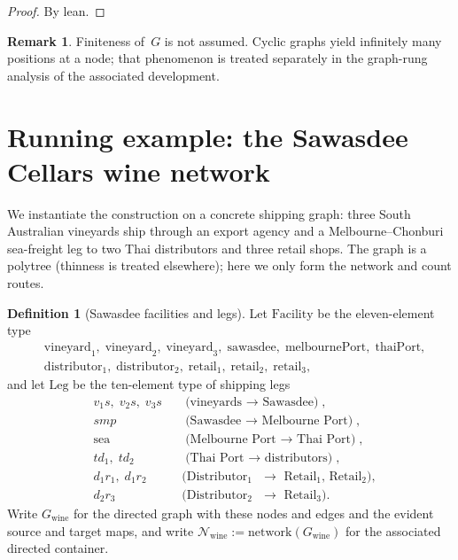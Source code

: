 \documentclass[11pt,a4paper]{article}
\theoremstyle{plain}
\theoremstyle{definition}
\newtheorem{definition}[theorem]{Definition}
\newtheorem{remark}[theorem]{Remark}
\begin{document}
\begin{proof}
By lean.
\end{proof}

\begin{remark}
Finiteness of~$G$ is not assumed. Cyclic graphs yield infinitely many
positions at a node; that phenomenon is treated separately in the graph-rung
analysis of the associated development.
\end{remark}

\section{Running example: the Sawasdee Cellars wine network}

We instantiate the construction on a concrete shipping graph: three South
Australian vineyards ship through an export agency and a Melbourne--Chonburi
sea-freight leg to two Thai distributors and three retail shops. The graph is
a polytree (thinness is treated elsewhere); here we only form the network and
count routes.

\begin{definition}[Sawasdee facilities and legs]\label{def:wine}
Let $\mathrm{Facility}$ be the eleven-element type
\begin{align*}
  &\mathrm{vineyard}_1,\;
  \mathrm{vineyard}_2,\;
  \mathrm{vineyard}_3,\;
  \mathrm{sawasdee},\;
  \mathrm{melbournePort},\;
  \mathrm{thaiPort},\\
  &\mathrm{distributor}_1,\;
  \mathrm{distributor}_2,\;
  \mathrm{retail}_1,\;
  \mathrm{retail}_2,\;
  \mathrm{retail}_3,
\end{align*}
and let $\mathrm{Leg}$ be the ten-element type of shipping legs
\begin{align*}
  &v_1s,\; v_2s,\; v_3s
    &&\text{(vineyards $\to$ Sawasdee)}, \\
  &smp
    &&\text{(Sawasdee $\to$ Melbourne Port)}, \\
  &\mathrm{sea}
    &&\text{(Melbourne Port $\to$ Thai Port)}, \\
  &td_1,\; td_2
    &&\text{(Thai Port $\to$ distributors)}, \\
  &d_1r_1,\; d_1r_2
    &&\text{(Distributor$_1$ $\to$ Retail$_1$, Retail$_2$)}, \\
  &d_2r_3
    &&\text{(Distributor$_2$ $\to$ Retail$_3$)}.
\end{align*}
Write $G_{\mathrm{wine}}$ for the directed graph with these nodes and edges and
the evident source and target maps, and write
$\mathcal{N}_{\mathrm{wine}} := \mathrm{network}(G_{\mathrm{wine}})$ for the
associated directed container.
\end{definition}
\end{document}
